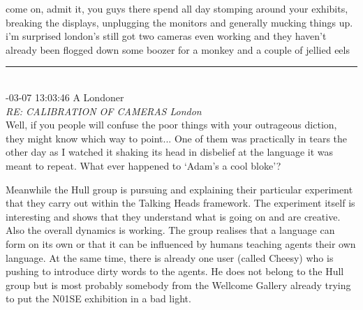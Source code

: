 \begin{mail}
come on, admit it, you guys there spend all day stomping around your exhibits, breaking the displays, unplugging the monitors and generally mucking things up. i'm surprised london's still got two cameras even working and they haven't already been flogged down some boozer for a monkey and a couple of jellied eels\\
\rule{0.8\textwidth}{.4pt}\\
{-03-07 13:03:46 A Londoner}\\
{\itshape RE: CALIBRATION OF CAMERAS London}\\
Well, if you people will confuse the poor things with your outrageous diction, they might know which way to point... One of them was practically in tears the other day as I watched it shaking its head in disbelief at the language it was meant to repeat. What ever happened to `Adam's a cool bloke'?\\
\end{mail}

Meanwhile the Hull group is pursuing and explaining their particular experiment that they carry out within the 
Talking Heads framework. The experiment itself is interesting and shows that they understand what is 
going on and are creative. Also the overall dynamics is working. The group realises that a language can form 
on its own or that it can be influenced by humans teaching agents their own language. 
At the same time, there is already one user (called Cheesy) who is pushing to introduce
dirty words to the agents. He does not belong to the Hull group but is most probably somebody from the 
Wellcome Gallery already trying to put the N01SE exhibition in a bad light. \\

